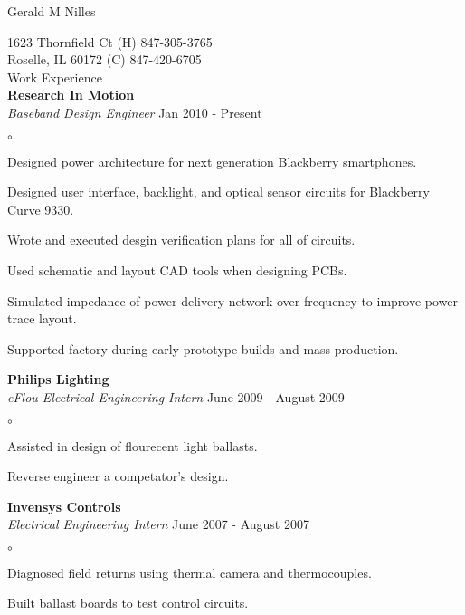 \documentclass[12pt, letterpaper]{minimal}
\begin{document}
\pagestyle{empty}


\newcommand{\myname}[1]{\begin{center} #1  \end{center}}
\newcommand{\myhead}[1]{ #1 }
\newcommand{\company}[1]{\hspace*{.5cm} \textbf{#1} }
\newcommand{\position}[2]{\hspace*{.5cm} \emph{#1} \hfill #2 }
\newenvironment{skills}{\begin{list}{$\circ$}{} }{\end{list}}
\newcommand{\skill}[1]{ \item #1 }

\myname{Gerald M Nilles}
1623 Thornfield Ct  \hfill (H) 847-305-3765 \\
Roselle, IL 60172   \hfill (C) 847-420-6705 \\

\myhead{Work Experience}\\
    \company{Research In Motion}\\
    \position{Baseband Design Engineer}{Jan 2010 - Present}
    \begin{skills}
        \skill{Designed power architecture for next generation Blackberry smartphones.}
        \skill{Designed user interface, backlight, and optical sensor circuits for Blackberry Curve 9330.}
        \skill{Wrote and executed desgin verification plans for all of circuits.}
        \skill{Used schematic and layout CAD tools when designing PCBs.}
        \skill{Simulated impedance of power delivery network over frequency to improve power trace layout.}
        \skill{Supported factory during early prototype builds and mass production.}
    \end{skills}

    \company{Philips Lighting} \\
    \position{eFlou Electrical Engineering Intern}{June 2009 - August 2009}
    \begin{skills}
        \skill{Assisted in design of flourecent light ballasts.}
        \skill{Reverse engineer a competator's design.}
    \end{skills}

    \company{Invensys Controls}\\
    \position{Electrical Engineering Intern}{June 2007 - August 2007}
    \begin{skills}
        \skill{Diagnosed field returns using thermal camera and thermocouples.}
        \skill{Built ballast boards to test control circuits.}
    \end{skills}
\end{document}
